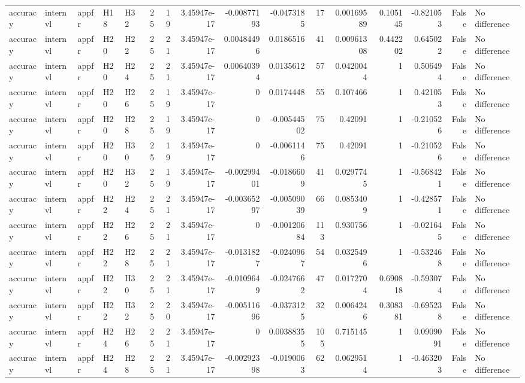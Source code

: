 \begin{longtable}{lllllrrrrrrrrrrl}
accuracy & internvl & appfr & H18 & H32 & 25 & 19 & 3.45947e-17 & -0.00877193 & -0.0473185 & 17 & 0.00169589 & 0.105145 & -0.821053 & False & No difference \\
accuracy & internvl & appfr & H20 & H22 & 25 & 21 & 3.45947e-17 & 0.00484496 & 0.0186516 & 41 & 0.00961308 & 0.442202 & 0.645022 & False & No difference \\
accuracy & internvl & appfr & H20 & H24 & 25 & 21 & 3.45947e-17 & 0.00640394 & 0.0135612 & 57 & 0.0420044 & 1 & 0.506494 & False & No difference \\
accuracy & internvl & appfr & H20 & H26 & 25 & 19 & 3.45947e-17 & 0 & 0.0174448 & 55 & 0.107466 & 1 & 0.421053 & False & No difference \\
accuracy & internvl & appfr & H20 & H28 & 25 & 19 & 3.45947e-17 & 0 & -0.00544502 & 75 & 0.42091 & 1 & -0.210526 & False & No difference \\
accuracy & internvl & appfr & H20 & H30 & 25 & 19 & 3.45947e-17 & 0 & -0.0061146 & 75 & 0.42091 & 1 & -0.210526 & False & No difference \\
accuracy & internvl & appfr & H20 & H32 & 25 & 19 & 3.45947e-17 & -0.00299401 & -0.0186609 & 41 & 0.0297745 & 1 & -0.568421 & False & No difference \\
accuracy & internvl & appfr & H22 & H24 & 25 & 21 & 3.45947e-17 & -0.00365297 & -0.00509039 & 66 & 0.0853409 & 1 & -0.428571 & False & No difference \\
accuracy & internvl & appfr & H22 & H26 & 25 & 21 & 3.45947e-17 & 0 & -0.00120684 & 113 & 0.930756 & 1 & -0.021645 & False & No difference \\
accuracy & internvl & appfr & H22 & H28 & 25 & 21 & 3.45947e-17 & -0.0131827 & -0.0240967 & 54 & 0.0325496 & 1 & -0.532468 & False & No difference \\
accuracy & internvl & appfr & H22 & H30 & 25 & 21 & 3.45947e-17 & -0.0109649 & -0.0247662 & 47 & 0.0172704 & 0.690818 & -0.593074 & False & No difference \\
accuracy & internvl & appfr & H22 & H32 & 25 & 20 & 3.45947e-17 & -0.00511696 & -0.0373125 & 32 & 0.0064246 & 0.308381 & -0.695238 & False & No difference \\
accuracy & internvl & appfr & H24 & H26 & 25 & 21 & 3.45947e-17 & 0 & 0.00388355 & 105 & 0.715145 & 1 & 0.0909091 & False & No difference \\
accuracy & internvl & appfr & H24 & H28 & 25 & 21 & 3.45947e-17 & -0.00292398 & -0.0190063 & 62 & 0.0629514 & 1 & -0.463203 & False & No difference \\

\end{longtable}
